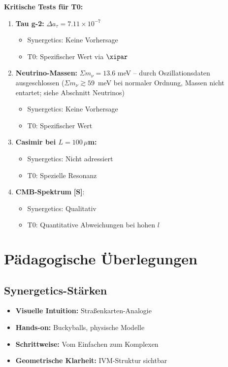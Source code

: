 	\begin{vorteil}
		\textbf{Kritische Tests für T0:}
		
		\begin{enumerate}
			\item \textbf{Tau g-2:} $\Delta a_\tau = 7.11 \times 10^{-7}$
			\begin{itemize}
				\item Synergetics: Keine Vorhersage
				\item T0: Spezifischer Wert via $\xipar$
			\end{itemize}
			
			\item \textbf{Neutrino-Massen:} $\Sigma m_\nu = 13.6$ meV -- durch Oszillationsdaten ausgeschlossen ($\Sigma m_\nu \gtrsim 59$~meV bei normaler Ordnung, Massen nicht entartet; siehe Abschnitt Neutrinos)
			\begin{itemize}
				\item Synergetics: Keine Vorhersage
				\item T0: Spezifischer Wert
			\end{itemize}
			
			\item \textbf{Casimir bei $L = 100\,\mu$m:}
			\begin{itemize}
				\item Synergetics: Nicht adressiert
				\item T0: Spezielle Resonanz
			\end{itemize}
			
			\item \textbf{CMB-Spektrum} \textbf{[S]}:
			\begin{itemize}
				\item Synergetics: Qualitativ
				\item T0: Quantitative Abweichungen bei hohen $l$
			\end{itemize}
		\end{enumerate}
	\end{vorteil}
	
	\section{Pädagogische Überlegungen}
	
	\subsection{Synergetics-Stärken}
	
	\begin{itemize}
		\item \textbf{Visuelle Intuition:} Straßenkarten-Analogie
		\item \textbf{Hands-on:} Buckyballs, physische Modelle
		\item \textbf{Schrittweise:} Vom Einfachen zum Komplexen
		\item \textbf{Geometrische Klarheit:} IVM-Struktur sichtbar
	\end{itemize}
	
